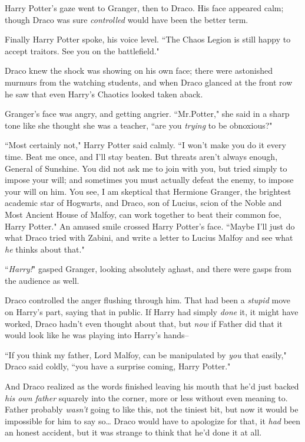Harry Potter's gaze went to Granger, then to Draco. His face appeared calm; though Draco was sure \emph{controlled} would have been the better term.

Finally Harry Potter spoke, his voice level. ``The Chaos Legion is still happy to accept traitors. See you on the battlefield."

Draco knew the shock was showing on his own face; there were astonished murmurs from the watching students, and when Draco glanced at the front row he saw that even Harry's Chaotics looked taken aback.

Granger's face was angry, and getting angrier. ``Mr.\?Potter," she said in a sharp tone like she thought she was a teacher, ``are you \emph{trying} to be obnoxious?"

``Most certainly not," Harry Potter said calmly. ``I won't make you do it every time. Beat me once, and I'll stay beaten. But threats aren't always enough, General of Sunshine. You did not ask me to join with you, but tried simply to impose your will; and sometimes you must actually defeat the enemy, to impose your will on him. You see, I am skeptical that Hermione Granger, the brightest academic star of Hogwarts, and Draco, son of Lucius, scion of the Noble and Most Ancient House of Malfoy, can work together to beat their common foe, Harry Potter." An amused smile crossed Harry Potter's face. ``Maybe I'll just do what Draco tried with Zabini, and write a letter to Lucius Malfoy and see what \emph{he} thinks about that."

``\emph{Harry!}" gasped Granger, looking absolutely aghast, and there were gasps from the audience as well.

Draco controlled the anger flushing through him. That had been a \emph{stupid} move on Harry's part, saying that in public. If Harry had simply \emph{done} it, it might have worked, Draco hadn't even thought about that, but \emph{now} if Father did that it would look like he was playing into Harry's hands\---

``If you think my father, Lord Malfoy, can be manipulated by \emph{you} that easily," Draco said coldly, ``you have a surprise coming, Harry Potter."

And Draco realized as the words finished leaving his mouth that he'd just backed \emph{his own father} squarely into the corner, more or less without even meaning to. Father probably \emph{wasn't} going to like this, not the tiniest bit, but now it would be impossible for him to say so{\ldots} Draco would have to apologize for that, it \emph{had} been an honest accident, but it was strange to think that he'd done it at all.

